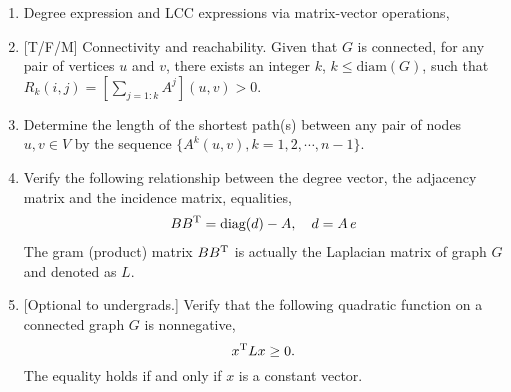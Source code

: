 \begin{enumerate}
\item Degree expression and LCC expressions via matrix-vector
  operations,
  
\item {[T/F/M]} Connectivity and reachability.  Given that $G$ is
  connected, for any pair of vertices $u$ and $v$, there exists an
  integer $k$, $k\leq \text{diam}(G)$, such that
  $R_k(i,j) = [ \sum_{j=1:k}A^{j} ] ( u,v ) > 0$.
  
  
\item Determine the length of the shortest path(s) between any pair of
  nodes $u,v \in V$ by the sequence
  $\{ A^k(u,v), k=1,2,\cdots, n-1 \}$.

\item   Verify the following relationship between the degree vector,
  the adjacency matrix and the incidence matrix, equalities,
  \begin{equation}
    \label{eq:graph-Laplace} 
    \begin{aligned} 
    BB^{\rm T} = \text{diag}(d) - A,
    \quad
    d = A\,e
    \end{aligned} 
  \end{equation} 
  The gram (product) matrix $BB^{\rm T}$ is actually the Laplacian
  matrix of graph $G$ and denoted as $L$.

\item {[Optional to undergrads.]}  Verify that the following quadratic
  function on a connected graph $G$ is nonnegative,
  \begin{equation}
    x^{\rm T} L x \geq 0.
  \end{equation}
  The equality holds if and only if $x$ is a constant vector. 
\end{enumerate}



  


